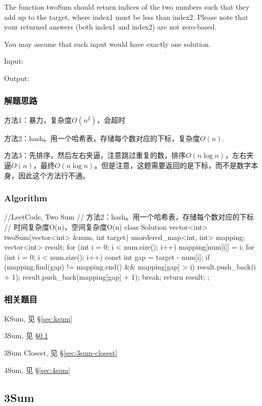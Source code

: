 The function twoSum should return indices of the two numbers such that they add 
up to the target, where index1 must be less than index2. Please note that your 
returned answers (both index1 and index2) are not zero-based.

You may assume that each input would have exactly one solution.

Input:  

Output: 


\subsubsection{解题思路}
方法1：暴力，复杂度$O(n^2)$，会超时

方法2：hash。用一个哈希表，存储每个数对应的下标，复杂度$O(n)$.

方法3：先排序，然后左右夹逼，注意跳过重复的数，排序$O(n\log n)$，左右夹逼$O(n)$，最终$O(n\log 
n)$。但是注意，这题需要返回的是下标，而不是数字本身，因此这个方法行不通。


\subsubsection{Algorithm}
\begin{Code}
	//LeetCode, Two Sum
	// 方法2：hash。用一个哈希表，存储每个数对应的下标
	// 时间复杂度O(n)，空间复杂度O(n)
	class Solution {
		vector<int> twoSum(vector<int> &num, int target) {
			unordered_map<int, int> mapping;
			vector<int> result;
			for (int i = 0; i < num.size(); i++) 
				mapping[num[i]] = i;
			for (int i = 0; i < num.size(); i++) {
				const int gap = target - num[i];
				if (mapping.find(gap) != mapping.end() && mapping[gap] > i) {
					result.push_back(i + 1);
					result.push_back(mapping[gap] + 1);
					break;
				}
			}
			return result;
		}
	};
\end{Code}


\subsubsection{相关题目}
\begindot
\item KSum, 见 \S \ref{sec:ksum}
\item 3Sum, 见 \S \ref{sec:3sum}
\item 3Sum Closest, 见 \S \ref{sec:3sum-closest}
\item 4Sum, 见 \S \ref{sec:4sum}
\myenddot


\subsection{3Sum} %
\label{sec:3sum}


